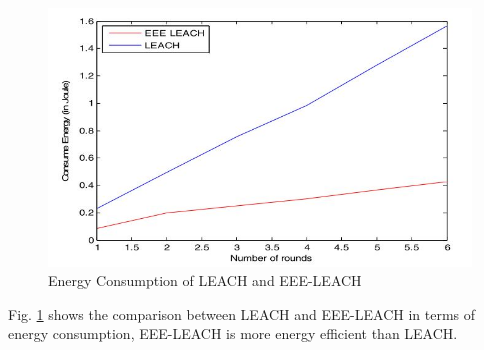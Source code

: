 \documentclass[11pt]{report}
\begin{document}
    \begin{figure}[h!]
		\centering
		\includegraphics[width=0.5\linewidth]{eeeleach1.jpg}
		\caption{Energy Consumption of LEACH and EEE-LEACH}
		\label{eee1}
	\end{figure}
	Fig. \ref {eee1} shows the comparison between LEACH and EEE-LEACH in terms of energy consumption, EEE-LEACH is more energy efficient than LEACH. 

	
\end{document}
